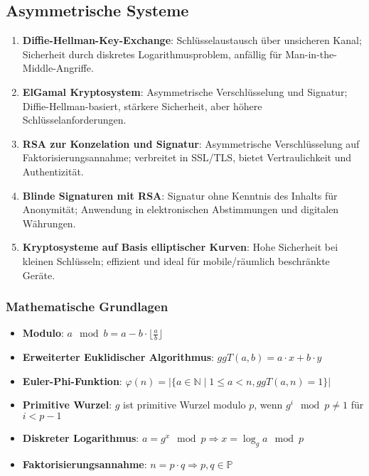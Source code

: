 \documentclass{article}
\begin{document}
\subsection{Asymmetrische Systeme}
\begin{enumerate}
  \item \textbf{Diffie-Hellman-Key-Exchange}: Schlüsselaustausch über unsicheren Kanal; Sicherheit durch diskretes Logarithmusproblem, anfällig für Man-in-the-Middle-Angriffe.
  \item \textbf{ElGamal Kryptosystem}: Asymmetrische Verschlüsselung und Signatur; Diffie-Hellman-basiert, stärkere Sicherheit, aber höhere Schlüsselanforderungen.
  \item \textbf{RSA zur Konzelation und Signatur}: Asymmetrische Verschlüsselung auf Faktorisierungsannahme; verbreitet in SSL/TLS, bietet Vertraulichkeit und Authentizität.
  \item \textbf{Blinde Signaturen mit RSA}: Signatur ohne Kenntnis des Inhalts für Anonymität; Anwendung in elektronischen Abstimmungen und digitalen Währungen.
  \item \textbf{Kryptosysteme auf Basis elliptischer Kurven}: Hohe Sicherheit bei kleinen Schlüsseln; effizient und ideal für mobile/räumlich beschränkte Geräte.
\end{enumerate}

\subsubsection{Mathematische Grundlagen}
\begin{itemize}
  \item \textbf{Modulo}: $a \mod b = a - b \cdot \lfloor \frac{a}{b} \rfloor$
  \item \textbf{Erweiterter Euklidischer Algorithmus}: $ggT(a, b) = a \cdot x + b \cdot y$
  \item \textbf{Euler-Phi-Funktion}: $\varphi(n) = |\{a \in \mathbb{N} \mid 1 \leq a < n, ggT(a, n) = 1\}|$
  \item \textbf{Primitive Wurzel}: $g$ ist primitive Wurzel modulo $p$, wenn $g^i \mod p \neq 1$ für $i < p-1$
  \item \textbf{Diskreter Logarithmus}: $a = g^x \mod p \Rightarrow x = \log_g a \mod p$
  \item \textbf{Faktorisierungsannahme}: $n = p \cdot q \Rightarrow p, q \in \mathbb{P}$
\end{itemize}
\end{document}
